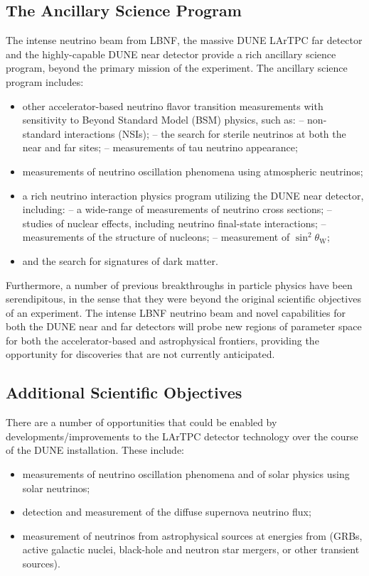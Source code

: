 \subsection{The Ancillary Science Program}

The intense neutrino beam from LBNF, the massive DUNE LArTPC far detector and the highly-capable DUNE near detector provide a rich ancillary science program, beyond the primary mission of the experiment. The ancillary science program includes:
\begin{itemize}
     \item other accelerator-based neutrino flavor transition measurements with sensitivity to Beyond Standard Model (BSM) physics, such as:    
            \subitem -- non-standard interactions (NSIs);
             \subitem -- the search for sterile neutrinos at both the near and far sites;
             \subitem -- measurements of tau neutrino appearance;
     \item measurements of neutrino oscillation phenomena using atmospheric neutrinos;
     \item a rich neutrino interaction physics program utilizing the DUNE near detector, including:
         \subitem -- a wide-range of measurements of neutrino cross sections;
         \subitem -- studies of nuclear effects, including neutrino final-state interactions;
         \subitem -- measurements of the structure of nucleons;      
         \subitem -- measurement of $\sin^2\theta_\text{W}$;  
     \item  and the search for signatures of dark matter.
\end{itemize} 
Furthermore, a number of previous breakthroughs in particle physics have been serendipitous, in the sense that they were beyond the
original scientific objectives of an experiment. The intense LBNF neutrino beam and novel capabilities for both 
the DUNE near and far detectors will probe new regions of parameter space for both the accelerator-based and astrophysical frontiers, 
providing the opportunity for discoveries that are not currently anticipated.



\subsection{Additional Scientific Objectives}
There are a number of opportunities that could be enabled by developments/improvements to the LArTPC detector technology over the course of the DUNE installation. These include:
\begin{itemize}
      \item measurements of neutrino oscillation phenomena and of solar physics using solar neutrinos;
      \item detection and measurement of the diffuse supernova neutrino flux;
      \item measurement of neutrinos from astrophysical sources at energies from (GRBs, active galactic nuclei, black-hole and neutron star mergers, or other transient sources).
\end{itemize}


 

